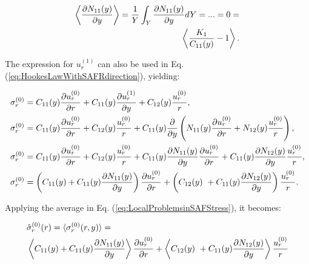 \begin{equation}
    \begin{aligned}
        \left\langle\frac{\partial N_{11}(y)}{\partial y}\right\rangle = \frac{1}{Y}\int_Y\frac{\partial N_{11}(y)}{\partial y} dY = ... = 0 = \\
        \left\langle \frac{K_1}{C_{11}(y)} - 1 \right\rangle.
    \end{aligned}
\end{equation}

The expression for $u_r^{(1)}$ can also be used in Eq. (\ref{eq:HookesLawWithSAFRdirection}), yielding:

\begin{equation}
    \begin{aligned} \label{eq:LocalProblemsinSAFStress}
       &\sigma^{(0)}_r =  C_{11}(y) \frac{\partial u_r^{(0)}}{\partial r} + C_{11}(y) \frac{\partial u_r^{(1)}}{\partial y} + C_{12}(y)\frac{u_r^{(0)}}{r},\\
       &\sigma^{(0)}_r =  C_{11}(y) \frac{\partial u_r^{(0)}}{\partial r} + C_{12}(y)\frac{u_r^{(0)}}{r} + C_{11}(y) \frac{\partial }{\partial y}\left( 
        N_{11}(y) \frac{\partial u_r^{(0)}}{\partial r} + N_{12}(y)\frac{u_r^{(0)}}{r}
       \right),\\
        &\sigma^{(0)}_r = C_{11}(y) \frac{\partial u_r^{(0)}}{\partial r} + C_{12}(y)\frac{u_r^{(0)}}{r} + C_{11}(y) \frac{\partial N_{11}(y)}{\partial y}\frac{\partial u_r^{(0)}}{\partial r} + C_{11}(y)\frac{\partial N_{12}(y)}{\partial y}\frac{u_r^{(0)}}{r},\\
        &\sigma^{(0)}_r = \left( C_{11}(y) + C_{11}(y) \frac{\partial N_{11}(y)}{\partial y}\right)\frac{\partial u_r^{(0)}}{\partial r} + \left(C_{12}(y)\ + C_{11}(y)\frac{\partial N_{12}(y)}{\partial y}\right)\frac{u_r^{(0)}}{r}.\\
    \end{aligned}
\end{equation}

Applying the average in Eq. (\ref{eq:LocalProblemsinSAFStress}), it becomes:

\begin{equation}
    \begin{aligned}\label{eq:EffectiveHookesLawR}
        &\hat{\sigma}^{(0)}_r(r) = \langle \sigma^{(0)}_r(r,y)\rangle = \\
        &\left \langle C_{11}(y) + C_{11}(y) \frac{\partial N_{11}(y)}{\partial y}\right\rangle \frac{\partial u_r^{(0)}}{\partial r} + \left \langle C_{12}(y)\ + C_{11}(y)\frac{\partial N_{12}(y)}{\partial y}\right \rangle\frac{u_r^{(0)}}{r} \\
    \end{aligned}
\end{equation}

